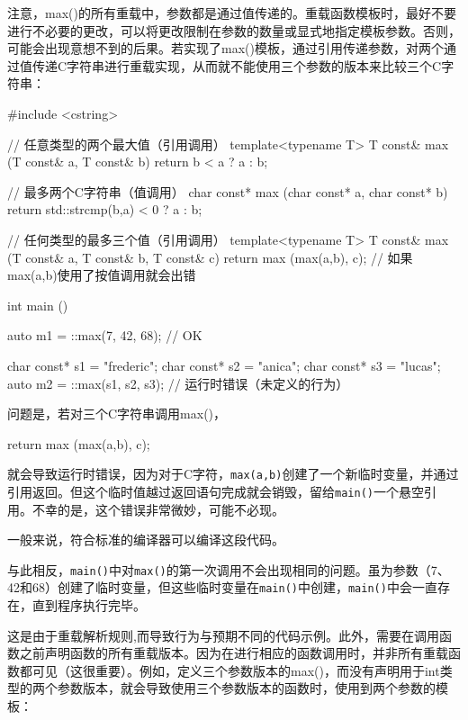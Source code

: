 注意，max()的所有重载中，参数都是通过值传递的。重载函数模板时，最好不要进行不必要的更改，可以将更改限制在参数的数量或显式地指定模板参数。否则，可能会出现意想不到的后果。若实现了max()模板，通过引用传递参数，对两个通过值传递C字符串进行重载实现，从而就不能使用三个参数的版本来比较三个C字符串：

\begin{cpp}
#include <cstring>

// 任意类型的两个最大值（引用调用）
template<typename T>
T const& max (T const& a, T const& b)
{
	return b < a ? a : b;
}

// 最多两个C字符串（值调用）
char const* max (char const* a, char const* b)
{
	return std::strcmp(b,a) < 0 ? a : b;
}

// 任何类型的最多三个值（引用调用）
template<typename T>
T const& max (T const& a, T const& b, T const& c)
{
	return max (max(a,b), c); // 如果max(a,b)使用了按值调用就会出错
}

int main ()
{
	auto m1 = ::max(7, 42, 68); // OK
	
	char const* s1 = "frederic";
	char const* s2 = "anica";
	char const* s3 = "lucas";
	auto m2 = ::max(s1, s2, s3); // 运行时错误（未定义的行为）
}
\end{cpp}

问题是，若对三个C字符串调用max()，

\begin{cpp}
return max (max(a,b), c);
\end{cpp}

就会导致运行时错误，因为对于C字符，\texttt{max(a,b)}创建了一个新临时变量，并通过引用返回。但这个临时值越过返回语句完成就会销毁，留给\texttt{main()}一个悬空引用。不幸的是，这个错误非常微妙，可能不必现。

\begin{notice}
一般来说，符合标准的编译器可以编译这段代码。
\end{notice}

与此相反，\texttt{main()}中对\texttt{max()}的第一次调用不会出现相同的问题。虽为参数（7、42和68）创建了临时变量，但这些临时变量在\texttt{main()}中创建，\texttt{main()}中会一直存在，直到程序执行完毕。

这是由于重载解析规则,而导致行为与预期不同的代码示例。此外，需要在调用函数之前声明函数的所有重载版本。因为在进行相应的函数调用时，并非所有重载函数都可见（这很重要）。例如，定义三个参数版本的max()，而没有声明用于int类型的两个参数版本，就会导致使用三个参数版本的函数时，使用到两个参数的模板：

